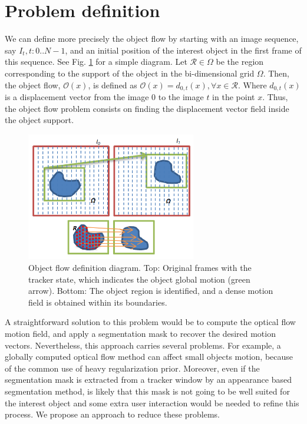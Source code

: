 \section{Problem definition}
\label{sec:definition}

We can define more precisely the object flow by starting with an image sequence, say $I_t, t:0..N-1$, and an initial 
position of the interest object in the first frame of this sequence. See Fig. \ref{diagram} for a simple diagram. Let $\mathcal{R} \in \Omega$ be the region corresponding to the support of the object in the
bi-dimensional grid $\Omega$. Then, the object flow, $\mathcal{O}(x)$,  is defined as $\mathcal{O}(x) = d_{0,t}(x), \forall x \in \mathcal{R}$. 
Where $d_{0,t}(x)$ is a displacement vector from the image $0$ to 
the image $t$ in the point $x$. Thus, the object flow problem consists 
on finding the displacement vector field inside the object support.

   \begin{figure}[bhp]
      \centering
      \includegraphics[width=0.66\textwidth]{../images/diagram.png}
      \caption{ Object flow definition diagram. Top: Original frames with the tracker state, which 
      indicates the object global motion (green arrow). Bottom: The object region is identified, and 
      a dense motion field is obtained within its boundaries.}
      \label{diagram}
   \end{figure}

A straightforward solution to this problem would be to compute the optical flow motion field, and apply 
a segmentation mask to recover the desired motion vectors. Nevertheless, this approach carries several 
problems. For example, a globally computed optical flow method can affect small objects motion, because of 
the common use of heavy regularization prior. Moreover, even if the segmentation mask is extracted from a 
tracker window by an appearance based segmentation method, is likely that this mask is not going to be well suited for the 
interest object and some extra user interaction would be needed to refine this process. We propose an approach 
to reduce these problems.

